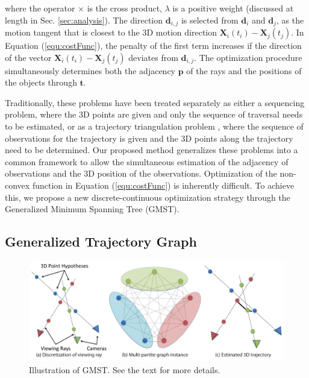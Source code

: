 where the operator $\times$ is the cross product, $\lambda$ is a positive weight (discussed at length in Sec. \ref{sec:analysis}). The direction $\mathbf{d}_{i,j}$ is selected from $\mathbf{d}_i$ and $\mathbf{d}_j$, as the motion tangent that is closest to the 3D motion direction $\mathbf{X}_i(t_i)-\mathbf{X}_j(t_j)$.
In Equation (\ref{equ:costFunc}), the penalty of the first term increases if the direction of the vector $\mathbf{X}_i(t_i)-\mathbf{X}_j(t_j)$ deviates from $\mathbf{d}_{i,j}$.
The optimization procedure simultaneously determines both the adjacency $\mathbf{p}$ of the rays and the positions of the objects through $\mathbf{t}$.

Traditionally, these problems have been treated separately as either a sequencing problem,
where the 3D points are given and only the sequence of traversal needs to be estimated, or as a trajectory triangulation problem \cite{Park_ECCV2010,Valmadre_CVPR2012}, where the sequence of observations for the trajectory is given and the 3D points along the trajectory need to be determined. Our proposed method generalizes these problems into a common framework to allow the simultaneous estimation of the adjacency of observations and the 3D position of the observations. %
Optimization of the non-convex function in Equation (\ref{equ:costFunc}) is inherently difficult. To achieve this, we propose a new discrete-continuous  optimization strategy through the Generalized Minimum Spanning Tree (GMST).

\subsection{Generalized Trajectory Graph}
\begin{figure}[t]
\centering
    \includegraphics[width=1\columnwidth]{chapter4/resource/gmst_eccv.pdf}
\caption{Illustration of GMST. See the text for more details.}
\label{fig:gmst}
\end{figure}

